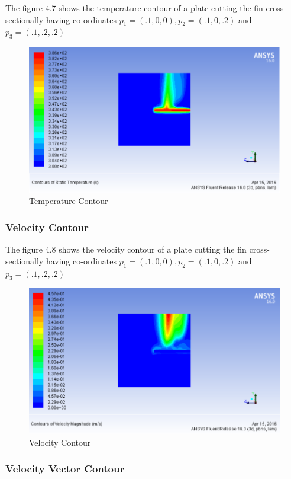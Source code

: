 The figure 4.7 shows the temperature contour of a plate cutting the fin cross-sectionally having co-ordinates $ p_1 = (.1,0,0) , p_2 = (.1,0,.2) $ and $ p_3 = (.1,.2,.2) $


\begin{figure}[h]
\label{ss}    %
\centering
\includegraphics[width= 11 cm]{110.png}
\caption{Temperature Contour}
\end{figure}

\subsubsection{Velocity Contour}

The figure 4.8 shows the velocity contour of a plate cutting the fin cross-sectionally having co-ordinates $ p_1 = (.1,0,0) , p_2 = (.1,0,.2) $ and $ p_3 = (.1,.2,.2) $


\begin{figure}[h]
	\label{ss}    %
	\centering
	\includegraphics[width= 11 cm]{111.png}
	\caption{Velocity Contour}
\end{figure}


\subsubsection{Velocity Vector Contour}

